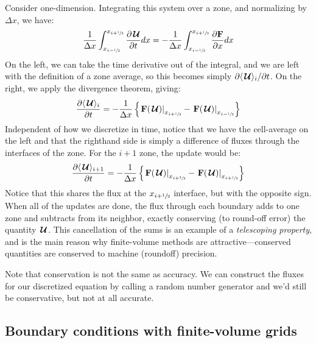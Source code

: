 Consider one-dimension.
Integrating this system over a zone, and normalizing by $\Delta x$, we have:
\begin{equation}
\frac{1}{\Delta x} \int_{x_{i-{\sfrac{1}{2}}}}^{x_{i+{\sfrac{1}{2}}}} {\frac{{\partial{\,\boldsymbol{\mathcal{U}}}}}{\partial t}} dx =
  -\frac{1}{\Delta x} \int_{x_{i-{\sfrac{1}{2}}}}^{x_{i+{\sfrac{1}{2}}}} \frac{\partial {\bf F}}{\partial x} dx
\end{equation}
On the left, we can take the time derivative out of the integral, and
we are left with the definition of a zone average, so this becomes
simply $\partial \langle {\,\boldsymbol{\mathcal{U}}}\rangle_i/\partial t$.  On the right, we
apply the divergence theorem, giving:
\begin{equation}
\frac{\partial \langle {\,\boldsymbol{\mathcal{U}}}\rangle_i}{\partial t} =
  - \frac{1}{\Delta x} \left \{ \left . {\bf F}({\,\boldsymbol{\mathcal{U}}}) \right |_{x_{i+{\sfrac{1}{2}}}} -
                                \left . {\bf F}({\,\boldsymbol{\mathcal{U}}}) \right |_{x_{i-{\sfrac{1}{2}}}} \right \}
\end{equation}
Independent of how we discretize in time, notice that we have the cell-average
on the left and that the righthand side
is simply a difference of fluxes through the interfaces of the zone.
For the $i+1$ zone, the update would be:
\begin{equation}
\label{eq:consup}
\frac{\partial \langle {\,\boldsymbol{\mathcal{U}}}\rangle_{i+1}}{\partial t} =
  - \frac{1}{\Delta x} \left \{ \left . {\bf F}({\,\boldsymbol{\mathcal{U}}}) \right |_{x_{i+\sfrac{3}{2}}} -
                                \left . {\bf F}({\,\boldsymbol{\mathcal{U}}}) \right |_{x_{i+{\sfrac{1}{2}}}} \right \}
\end{equation}
Notice that this shares the flux at the $x_{i+{\sfrac{1}{2}}}$ interface, but with the
opposite sign.   When all of the updates are done, the flux through each
boundary adds to one zone and subtracts from its neighbor, exactly conserving
(to round-off error) the quantity ${\,\boldsymbol{\mathcal{U}}}$.  This cancellation of the sums
is an example of a {\em telescoping property}, and is the main reason
why finite-volume methods are attractive---conserved quantities are
conserved to machine (roundoff) precision.

Note that conservation is not the same as accuracy.  We can construct
the fluxes for our discretized equation by calling a random number
generator and we'd still be conservative, but not at all accurate.

\subsection{Boundary conditions with finite-volume grids}

\label{sec:fv:bcs}

